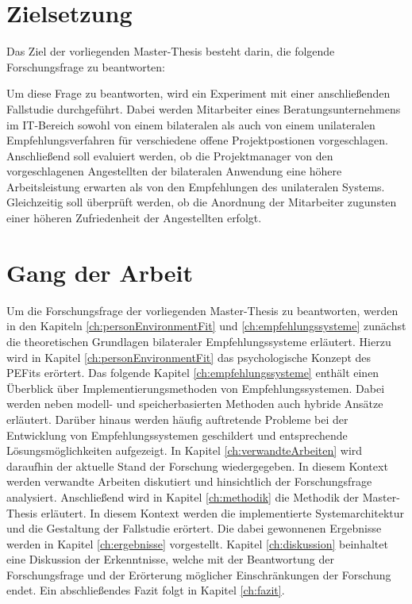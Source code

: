 \newpage
\section{Zielsetzung}
\label{sec:intro:zielsetzung}
Das Ziel der vorliegenden Master-Thesis besteht darin, die folgende Forschungsfrage zu beantworten:

\forschungsfrage

Um diese Frage zu beantworten, wird ein Experiment mit einer anschließenden Fallstudie durchgeführt. Dabei werden Mitarbeiter eines Beratungsunternehmens im IT-Bereich sowohl von einem bilateralen als auch von einem unilateralen Empfehlungsverfahren für verschiedene offene Projektpostionen vorgeschlagen. Anschließend soll evaluiert werden, ob die Projektmanager von den vorgeschlagenen Angestellten der bilateralen Anwendung eine höhere Arbeitsleistung erwarten als von den Empfehlungen des unilateralen Systems. Gleichzeitig soll überprüft werden, ob die Anordnung der Mitarbeiter zugunsten einer höheren Zufriedenheit der Angestellten erfolgt.

\section{Gang der Arbeit}
\label{sec:intro:gangDerArbeit}
Um die Forschungsfrage der vorliegenden Master-Thesis zu beantworten, werden in den Kapiteln \ref{ch:personEnvironmentFit} und \ref{ch:empfehlungssysteme} zunächst die theoretischen Grundlagen bilateraler Empfehlungssysteme erläutert. Hierzu wird in Kapitel \ref{ch:personEnvironmentFit} das psychologische Konzept des \acp{PEFit} erörtert. Das folgende Kapitel \ref{ch:empfehlungssysteme} enthält einen Überblick über Implementierungsmethoden von Empfehlungssystemen. Dabei werden neben modell- und speicherbasierten Methoden auch hybride Ansätze erläutert. Darüber hinaus werden häufig auftretende Probleme bei der Entwicklung von Empfehlungssystemen geschildert und entsprechende Lösungsmöglichkeiten aufgezeigt. In Kapitel \ref{ch:verwandteArbeiten} wird daraufhin der aktuelle Stand der Forschung wiedergegeben. In diesem Kontext werden verwandte Arbeiten diskutiert und hinsichtlich der Forschungsfrage analysiert. Anschließend wird in Kapitel \ref{ch:methodik} die Methodik der Master-Thesis erläutert. In diesem Kontext werden die implementierte Systemarchitektur und die Gestaltung der Fallstudie erörtert. Die dabei gewonnenen Ergebnisse werden in Kapitel \ref{ch:ergebnisse} vorgestellt. Kapitel \ref{ch:diskussion} beinhaltet eine Diskussion der Erkenntnisse, welche mit der Beantwortung der Forschungsfrage und der Erörterung möglicher Einschränkungen der Forschung endet. Ein abschließendes Fazit folgt in Kapitel \ref{ch:fazit}.
